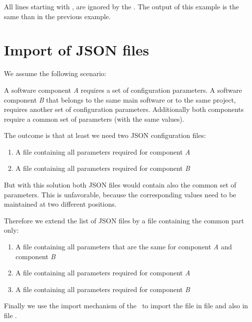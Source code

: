 All lines starting with \pcode{//}, are ignored by the \pkg. The output of this example is the same than in the previous example.



\newpage

\section{Import of JSON files}

We assume the following scenario:

A software component \textit{A} requires a set of configuration parameters. A software component \textit{B} that belongs to the same
main software or to the same project, requires another set of configuration parameters. Additionally both components
require a common set of parameters (with the same values).

The outcome is that at least we need two JSON configuration files:

\begin{enumerate}
   \item A file  containing all parameters required for component \textit{A}
   \item A file  containing all parameters required for component \textit{B}
\end{enumerate}

But with this solution both JSON files would contain also the common set of parameters. This is unfavorable, because
the corresponding values need to be maintained at two different positions.

Therefore we extend the list of JSON files by a file containing the common part only:

\begin{enumerate}
   \item A file  containing all parameters that are the same for component \textit{A} and component \textit{B}
   \item A file  containing all parameters required for component \textit{A}
   \item A file  containing all parameters required for component \textit{B}
\end{enumerate}

Finally we use the import mechanism of the \pkg\ to import the file  in file  and also in
file .

